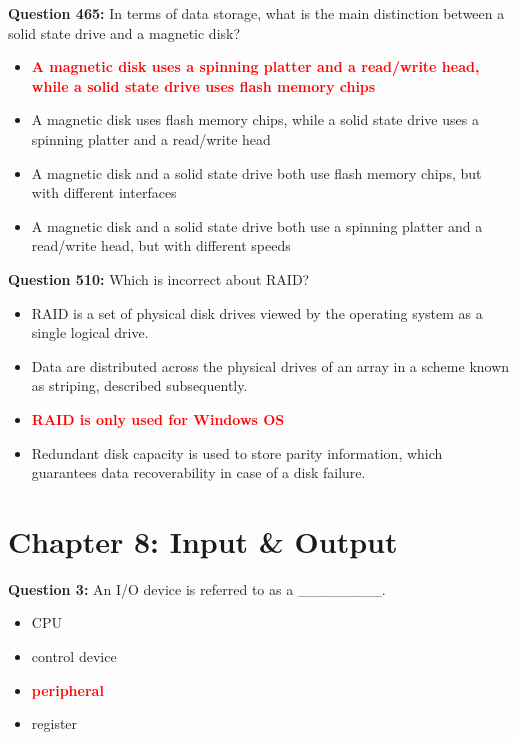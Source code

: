 \documentclass[12pt,a4paper]{article}
\begin{document}
\vspace{0.5cm}

\textbf{Question 465:} In terms of data storage, what is the main distinction between a solid state drive and a magnetic disk?

\begin{itemize}
    \item[\textbf{A.}] \textcolor{red}{\textbf{A magnetic disk uses a spinning platter and a read/write head, while a solid state drive uses flash memory chips}}
    \item[\textbf{B.}] A magnetic disk uses flash memory chips, while a solid state drive uses a spinning platter and a read/write head
    \item[\textbf{C.}] A magnetic disk and a solid state drive both use flash memory chips, but with different interfaces
    \item[\textbf{D.}] A magnetic disk and a solid state drive both use a spinning platter and a read/write head, but with different speeds
\end{itemize}

\vspace{0.5cm}

\textbf{Question 510:} Which is incorrect about RAID?

\begin{itemize}
    \item[\textbf{A.}] RAID is a set of physical disk drives viewed by the operating system as a single logical drive.
    \item[\textbf{B.}] Data are distributed across the physical drives of an array in a scheme known as striping, described subsequently.
    \item[\textbf{C.}] \textcolor{red}{\textbf{RAID is only used for Windows OS}}
    \item[\textbf{D.}] Redundant disk capacity is used to store parity information, which guarantees data recoverability in case of a disk failure.
\end{itemize}

\vspace{0.5cm}

\section{Chapter 8: Input \& Output}

\textbf{Question 3:} An I/O device is referred to as a ________.

\begin{itemize}
    \item[\textbf{A.}] CPU
    \item[\textbf{B.}] control device
    \item[\textbf{C.}] \textcolor{red}{\textbf{peripheral}}
    \item[\textbf{D.}] register
\end{itemize}
\end{document}
